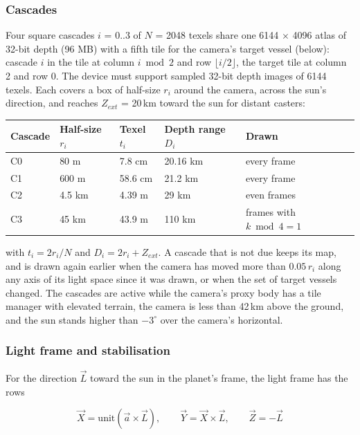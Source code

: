 \documentclass[Orbiter Technical Reference.tex]{subfiles}
\begin{document}
\begin{sloppypar}
\subsubsection{Cascades}
Four square cascades $i$ = 0..3 of $N$ = 2048 texels share one 6144 $\times$ 4096 atlas of 32-bit depth (96 MB) with a fifth tile for the camera's target vessel (below): cascade $i$ in the tile at column $i \bmod 2$ and row $\lfloor i/2 \rfloor$, the target tile at column 2 and row 0. The device must support sampled 32-bit depth images of 6144 texels. Each covers a box of half-size $r_{i}$ around the camera, across the sun's direction, and reaches $Z_{ext}$ = 20\,km toward the sun for distant casters:

\begin{longtable}{ |p{}|p{}|p{}|p{}|p{}| }
\hline\rule{0pt}{2ex}
\textbf{Cascade} & \textbf{Half-size} $r_{i}$ & \textbf{Texel} $t_{i}$ & \textbf{Depth range} $D_{i}$ & \textbf{Drawn}\\
\hline\rule{0pt}{2ex}
C0 & 80 m & 7.8 cm & 20.16 km & every frame\\
\hline\rule{0pt}{2ex}
C1 & 600 m & 58.6 cm & 21.2 km & every frame\\
\hline\rule{0pt}{2ex}
C2 & 4.5 km & 4.39 m & 29 km & even frames\\
\hline\rule{0pt}{2ex}
C3 & 45 km & 43.9 m & 110 km & frames with $k \bmod 4 = 1$\\
\hline
\end{longtable}

\noindent
with $t_{i} = 2r_{i}/N$ and $D_{i} = 2r_{i} + Z_{ext}$. A cascade that is not due keeps its map, and is drawn again earlier when the camera has moved more than $0.05\,r_{i}$ along any axis of its light space since it was drawn, or when the set of target vessels changed. The cascades are active while the camera's proxy body has a tile manager with elevated terrain, the camera is less than 42\,km above the ground, and the sun stands higher than $-3^{\circ}$ over the camera's horizontal.

\subsubsection{Light frame and stabilisation}
For the direction $\vec{L}$ toward the sun in the planet's frame, the light frame has the rows

\[ \vec{X} = \mathrm{unit}(\vec{a} \times \vec{L}), \qquad \vec{Y} = \vec{X} \times \vec{L}, \qquad \vec{Z} = -\vec{L} \]


\end{sloppypar}
\end{document}
